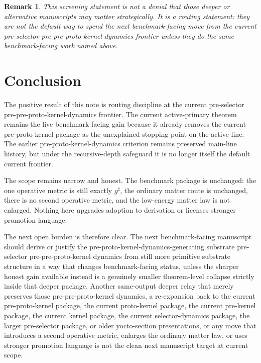 \documentclass[11pt]{article}
\newcommand{\CompletedMetric}{g^{\sharp}}
\newtheorem{remark}{Remark}
\begin{document}
\begin{remark}
This screening statement is not a denial that those deeper or alternative manuscripts may matter strategically. It is a routing statement: they are not the default way to spend the next benchmark-facing move from the current pre-selector pre-pre-proto-kernel-dynamics frontier unless they do the same benchmark-facing work named above.
\end{remark}

\section{Conclusion}

The positive result of this note is routing discipline at the current pre-selector pre-pre-proto-kernel-dynamics frontier. The current active-primary theorem remains the live benchmark-facing gain because it already removes the current pre-proto-kernel package as the unexplained stopping point on the active line. The earlier pre-proto-kernel-dynamics criterion remains preserved main-line history, but under the recursive-depth safeguard it is no longer itself the default current frontier.

The scope remains narrow and honest. The benchmark package is unchanged: the one operative metric is still exactly \(\CompletedMetric\), the ordinary matter route is unchanged, there is no second operative metric, and the low-energy matter law is not enlarged. Nothing here upgrades adoption to derivation or licenses stronger promotion language.

The next open burden is therefore clear. The next benchmark-facing manuscript should derive or justify the pre-proto-kernel-dynamics-generating substrate pre-selector pre-pre-proto-kernel dynamics from still more primitive substrate structure in a way that changes benchmark-facing status, unless the sharper honest gain available instead is a genuinely smaller theorem-level collapse strictly inside that deeper package. Another same-output deeper relay that merely preserves those pre-pre-proto-kernel dynamics, a re-expansion back to the current pre-proto-kernel package, the current proto-kernel package, the current pre-kernel package, the current kernel package, the current selector-dynamics package, the larger pre-selector package, or older yocto-section presentations, or any move that introduces a second operative metric, enlarges the ordinary matter law, or uses stronger promotion language is not the clean next manuscript target at current scope.
\end{document}

